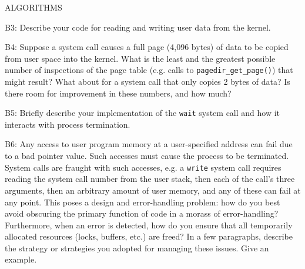 \begin{aspect}{ALGORITHMS}
	\begin{qc}
		B3: Describe your code for reading and writing user data from the kernel.
	\end{qc}

	\begin{qc}
		B4: Suppose a system call causes a full page (4,096 bytes) of data to be copied from user space into the kernel.
		What is the least and the greatest possible number of inspections of the page table (e.g. calls to \lstinline{pagedir_get_page()}) that might result?
		What about for a system call that only copies 2 bytes of data?
		Is there room for improvement in these numbers, and how much?
	\end{qc}

	\begin{qc}
		B5: Briefly describe your implementation of the \lstinline{wait} system call
		and how it interacts with process termination.
	\end{qc}

	\begin{qc}
		B6: Any access to user program memory at a user-specified address can fail due to a bad pointer value.
		Such accesses must cause the process to be terminated.
		System calls are fraught with such accesses,
		e.g. a \lstinline{write} system call requires reading the system call number from the user stack,
		then each of the call's three arguments, then an arbitrary amount of user memory, and any of these can fail at any point.
		This poses a design and error-handling problem: how do you best avoid obscuring the primary function of code in a morass of error-handling?
		Furthermore, when an error is detected, how do you ensure that all temporarily allocated resources (locks, buffers, etc.) are freed?
		In a few paragraphs, describe the strategy or strategies you adopted for managing these issues.
		Give an example.
	\end{qc}
\end{aspect}

